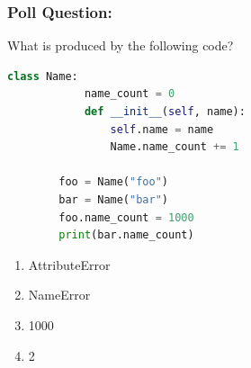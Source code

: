 \documentclass{beamer}
\begin{document}
%
%
%
\begin{frame}[fragile]
    \frametitle{Poll Question: }
    \begin{minipage}{0.69\textwidth}
        What is produced by the following code?
        \begin{lstlisting}[language=Python, autogobble, basicstyle=\tiny]
        class Name:
            name_count = 0
            def __init__(self, name):
                self.name = name
                Name.name_count += 1

        foo = Name("foo")
        bar = Name("bar")
        foo.name_count = 1000
        print(bar.name_count)
        \end{lstlisting}
    \end{minipage}
    \hfill
    \begin{minipage}{0.29\textwidth}
        \begin{enumerate}[A]
            \item AttributeError
            \item NameError
            \item 1000
            \item 2
        \end{enumerate}
    \end{minipage}
\end{frame}
\end{document}
